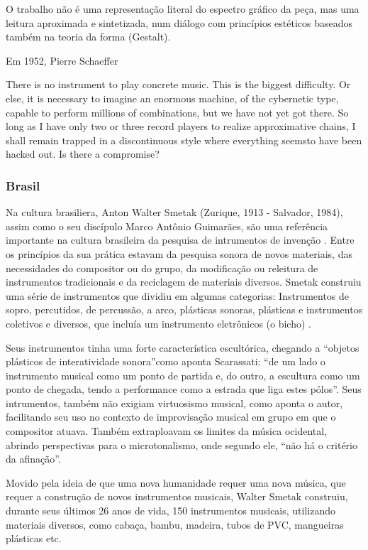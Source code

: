 O trabalho não é uma representação literal do espectro gráfico da peça, mas uma leitura aproximada e sintetizada, num diálogo com princípios estéticos baseados também na teoria da forma (Gestalt).


Em 1952, Pierre Schaeffer 

There is no instrument to play concrete music. This is the biggest difficulty. Or else, it is necessary to imagine an enormous machine, of the cybernetic type, capable to perform millions of combinations, but we have not yet got there. So long as I have only two or three record players to realize approximative chains, I shall remain trapped in a discontinuous style where everything seemsto have been hacked out. Is there a compromise?


\subsubsection{Brasil}
Na cultura brasiliera, Anton Walter Smetak (Zurique, 1913 - Salvador, 1984), assim como o seu discípulo Marco Antônio Guimarães, são uma referência importante na cultura brasileira da pesquisa de intrumentos de invenção \cite{Lima2018,Multimeios2001, Obici2014} . Entre os princípios da sua prática estavam da pesquisa sonora de novos materiais, das necessidades do compositor ou do grupo, da modificação ou releitura de instrumentos tradicionais e da reciclagem de materiais diversos. Smetak construiu uma série de instrumentos que dividiu em algumas categorias: Instrumentos de sopro, percutidos, de percussão, a arco, plásticas sonoras, plásticas e instrumentos coletivos e diversos, que incluía um instrumento eletrônicos (o bicho) \cite{Multimeios2001}. \cite{}

Seus instrumentos tinha uma forte característica escultórica, chegando a ``objetos plásticos de interatividade sonora''como aponta Scarassati: ``de um lado o instrumento musical como um ponto de partida e, do outro, a escultura como um ponto de chegada, tendo a performance como a estrada que liga estes pólos''. Seus intrumentos, também não exigiam virtuosismo musical, como aponta o autor, facilitando seu uso no contexto de improvisação musical em grupo em que o compositor atuava. Também extraploavam os limites da música ocidental, abrindo perspectivas para o microtonalismo, onde segundo ele, ``não há o critério da afinação''. 

\begin{citacao}
Movido pela ideia de que uma nova humanidade requer uma nova música, que requer a construção de novos instrumentos musicais, Walter Smetak construiu, durante seus últimos 26 anos de vida, 150 instrumentos musicais, utilizando materiais diversos, como cabaça, bambu, madeira, tubos de PVC, mangueiras plásticas etc. \cite{Andres2011}
\end{citacao}


